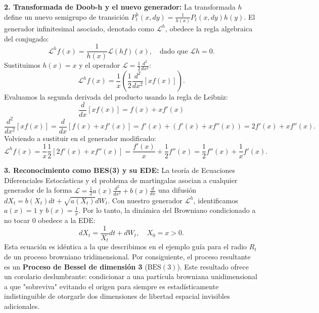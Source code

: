 \documentclass[11pt, letterpaper]{article}
\begin{document}
\begin{solucion}
    \textbf{2. Transformada de Doob-h y el nuevo generador:}
    La transformada $h$ define un nuevo semigrupo de transición $P_t^h(x, dy) = \frac{1}{h(x)} P_t(x, dy) h(y)$.
    El generador infinitesimal asociado, denotado como $\mathcal{L}^h$, obedece la regla algebraica del conjugado:
    \[ \mathcal{L}^h f(x) = \frac{1}{h(x)} \mathcal{L}(h f)(x), \quad \text{dado que } \mathcal{L}h = 0. \]
    Sustituimos $h(x) = x$ y el operador $\mathcal{L} = \frac{1}{2}\frac{d^2}{dx^2}$:
    \[ \mathcal{L}^h f(x) = \frac{1}{x} \left( \frac{1}{2} \frac{d^2}{dx^2} [x f(x)] \right). \]
    Evaluamos la segunda derivada del producto usando la regla de Leibniz:
    \[ \frac{d}{dx}[x f(x)] = f(x) + x f'(x) \]
    \[ \frac{d^2}{dx^2}[x f(x)] = \frac{d}{dx}[f(x) + x f'(x)] = f'(x) + \left(f'(x) + x f''(x)\right) = 2f'(x) + x f''(x). \]
    Volviendo a sustituir en el generador modificado:
    \[ \mathcal{L}^h f(x) = \frac{1}{x} \frac{1}{2} \left[ 2f'(x) + x f''(x) \right] = \frac{f'(x)}{x} + \frac{1}{2} f''(x) = \frac{1}{2} f''(x) + \frac{1}{x} f'(x). \]

    \textbf{3. Reconocimiento como BES(3) y su EDE:}
    La teoría de Ecuaciones Diferenciales Estocásticas y el problema de martingalas asocian a cualquier generador de la forma $\mathcal{L} = \frac{1}{2}a(x)\frac{d^2}{dx^2} + b(x)\frac{d}{dx}$ una difusión $dX_t = b(X_t)dt + \sqrt{a(X_t)}dW_t$.
    Con nuestro generador $\mathcal{L}^h$, identificamos $a(x) = 1$ y $b(x) = \frac{1}{x}$.
    Por lo tanto, la dinámica del Browniano condicionado a no tocar 0 obedece a la EDE:
    \[ dX_t = \frac{1}{X_t} dt + dW_t, \quad X_0 = x > 0. \]
    Esta ecuación es idéntica a la que describimos en el ejemplo guía para el radio $R_t$ de un proceso browniano tridimensional. Por consiguiente, el proceso resultante es un \textbf{Proceso de Bessel de dimensión 3} ($\text{BES}(3)$).
    Este resultado ofrece un corolario deslumbrante: condicionar a una partícula browniana unidimensional a que "sobreviva" evitando el origen para siempre es estadísticamente indistinguible de otorgarle dos dimensiones de libertad espacial invisibles adicionales.
\end{solucion}
\end{document}
